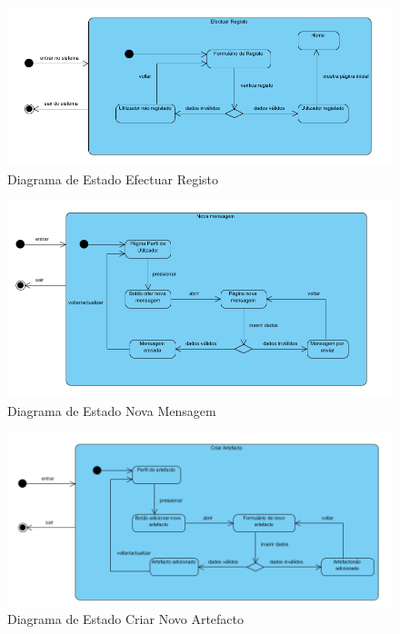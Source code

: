 ﻿\documentclass[12pt,a4paper]{article}
\begin{document}
\begin{figure}[h!]
\centering
\includegraphics[scale=0.7]{estado/registo}
\caption{Diagrama de Estado Efectuar Registo} 
\end{figure} 

\begin{figure}[h!]
\centering
\includegraphics[scale=0.7]{estado/novamensagem}
\caption{Diagrama de Estado Nova Mensagem} 
\end{figure} 

\begin{figure}[h!]
\centering
\includegraphics[scale=0.7]{estado/criarartefacto}
\caption{Diagrama de Estado Criar Novo Artefacto} 
\end{figure} 
  
\end{document}
